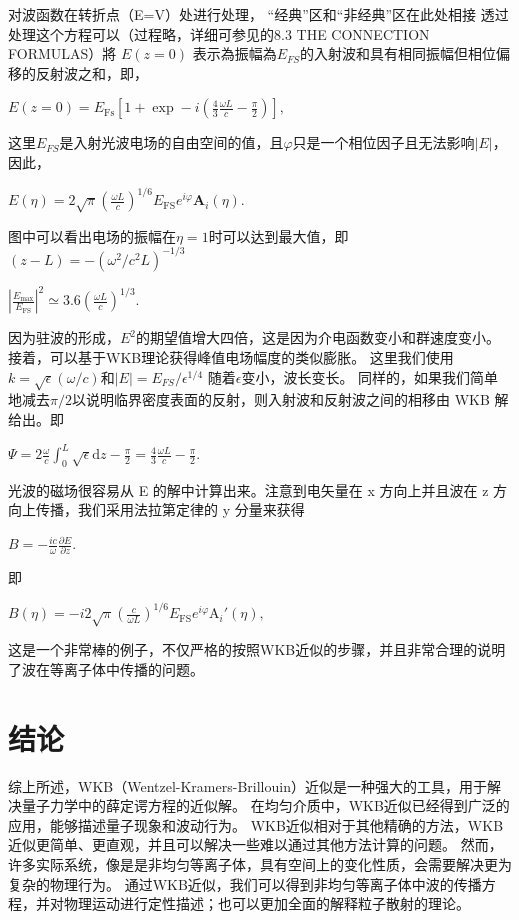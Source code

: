 \documentclass[12pt, a4paper, oneside]{ctexart}
\begin{document}
\begin{spacing}{2.0}
对波函数在转折点（E=V）处进行处理， “经典”区和“非经典”区在此处相接
透过处理这个方程可以（过程略，详细可参见\cite{griffiths_schroeter_2018}的8.3 THE CONNECTION FORMULAS）將 $E(z = 0)$ 表示為振幅為$E_{FS}$的入射波和具有相同振幅但相位偏移的反射波之和，即，
\begin{center}
    $\displaystyle E(z=0)=E_{\text{Fs}}\left[1+\exp-i\left(\frac{4}{3}\frac{\omega L}{c}-\frac{\pi}{2}\right)\right],$
\end{center}
这里$E_{FS}$是入射光波电场的自由空间的值，且$\varphi$只是一个相位因子且无法影响$|E|$，因此，
\begin{center}
    $\displaystyle E(\eta)=2\sqrt{\pi}\left(\frac{\omega L}{c}\right)^{1/6}E_{\text{FS}}e^{i\varphi}\mathbf{A}_i(\eta).$
\end{center}
图中可以看出电场的振幅在$\eta = 1$时可以达到最大值，即$(z-L) = -(\omega^2/c^2L)^{-1/3}$
\begin{center}
    $\displaystyle \left|\frac{E_{\max}}{E_{\text{FS}}}\right|^2\simeq3.6\left(\frac{\omega L}{c}\right)^{1/3}.$
\end{center}
因为驻波的形成，$E^2$的期望值增大四倍，这是因为介电函数变小和群速度变小。
接着，可以基于WKB理论获得峰值电场幅度的类似膨胀。 这里我们使用$k = \sqrt{\epsilon}(\omega/c)$和$|E| = E_{FS}/\epsilon^{1/4}$
随着$\epsilon$变小，波长变长。 
同样的，如果我们简单地减去$\pi/2$以说明临界密度表面的反射，则入射波和反射波之间的相移由 WKB 解给出。即
\begin{center}
    $\displaystyle \Psi=2\frac{\omega}{c}\int_{0}^{L}\sqrt{\epsilon}\mathrm{d}z-\frac{\pi}{2}=\frac{4}{3}\frac{\omega L}{c}-\frac{\pi}{2}.$
\end{center}

光波的磁场很容易从 E 的解中计算出来。注意到电矢量在 x 方向上并且波在 z 方向上传播，我们采用法拉第定律的 y 分量来获得
\begin{center}
    $\displaystyle B=-\frac{ic}{\omega}\frac{\partial E}{\partial z}.$
\end{center}即
\begin{center}
    $\displaystyle B(\eta)=-i2\sqrt{\pi}\left(\frac{c}{\omega L}\right)^{1/6}E_{\text{FS}}e^{i\varphi}\mathrm{A}_i'(\eta),$
\end{center}

这是一个非常棒的例子，不仅严格的按照WKB近似的步骤，并且非常合理的说明了波在等离子体中传播的问题。

\section{结论}
综上所述，WKB（Wentzel-Kramers-Brillouin）近似是一种强大的工具，用于解决量子力学中的薛定谔方程的近似解。
在均匀介质中，WKB近似已经得到广泛的应用，能够描述量子现象和波动行为。
WKB近似相对于其他精确的方法，WKB近似更简单、更直观，并且可以解决一些难以通过其他方法计算的问题。
然而，许多实际系统，像是是非均匀等离子体，具有空间上的变化性质，会需要解决更为复杂的物理行为。
通过WKB近似，我们可以得到非均匀等离子体中波的传播方程，并对物理运动进行定性描述；也可以更加全面的解释粒子散射的理论。


\end{spacing}
\end{document}
